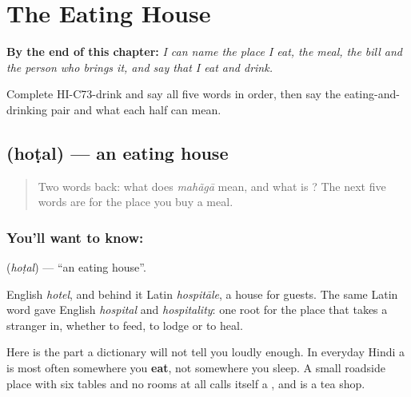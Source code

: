 
\chapter{The Eating House}
\label{ch:hi-the-eating-house}

\begin{chapteropening}
\textbf{By the end of this chapter:} \emph{I can name the place I eat, the meal, the bill and the person who brings it, and say that I eat and drink.}

Complete HI-C73-drink and say all five words in order, then say the eating-and-drinking pair and what each half can mean.
\end{chapteropening}

\section[\texorpdfstring{\hi{होटल} (hoṭal)}{होटल (hoṭal)}]{ (hoṭal) — an eating house}

\label{lesson:HI-C73-eating-house}



\begin{quote}
Two words back: what does \emph{mahãgā} mean, and what is \textbf{}? The next five words are for the place you buy a meal.
\end{quote}

\subsection*{You'll want to know: }
\textbf{} (\emph{hoṭal}) — \textquotedblleft{}an eating house\textquotedblright{}.

English \emph{hotel}, and behind it Latin \emph{hospitāle}, a house for guests. The same Latin word gave English \emph{hospital} and \emph{hospitality}: one root for the place that takes a stranger in, whether to feed, to lodge or to heal.

Here is the part a dictionary will not tell you loudly enough. In everyday Hindi a  is most often somewhere you \textbf{eat}, not somewhere you sleep. A small roadside place with six tables and no rooms at all calls itself a , and \textbf{ } is a tea shop.

